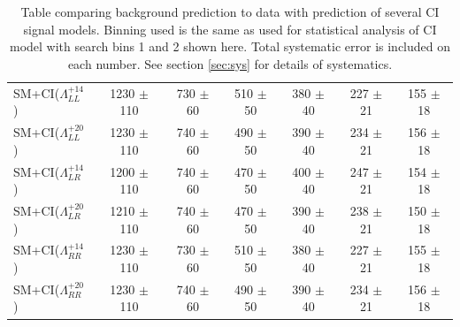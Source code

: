\begin {table}[h]
\begin{center}
\begin{tabular}{  l | c c c | c c c  }
			SM+CI($\Lambda^{+14}_{LL}$) & 1230 $\pm$ 110 & 730 $\pm$ 60 & 510 $\pm$ 50 & 380 $\pm$ 40 & 227 $\pm$ 21 & 155 $\pm$ 18 \\
			SM+CI($\Lambda^{+20}_{LL}$) & 1230 $\pm$ 110 & 740 $\pm$ 60 & 490 $\pm$ 50 & 390 $\pm$ 40 & 234 $\pm$ 21 & 156 $\pm$ 18 \\
			SM+CI($\Lambda^{+14}_{LR}$) & 1200 $\pm$ 110 & 740 $\pm$ 60 & 470 $\pm$ 50 & 400 $\pm$ 40 & 247 $\pm$ 21 & 154 $\pm$ 18 \\
			SM+CI($\Lambda^{+20}_{LR}$) & 1210 $\pm$ 110 & 740 $\pm$ 60 & 470 $\pm$ 50 & 390 $\pm$ 40 & 238 $\pm$ 21 & 150 $\pm$ 18 \\
			SM+CI($\Lambda^{+14}_{RR}$) & 1230 $\pm$ 110 & 730 $\pm$ 60 & 510 $\pm$ 50 & 380 $\pm$ 40 & 227 $\pm$ 21 & 155 $\pm$ 18 \\
			SM+CI($\Lambda^{+20}_{RR}$) & 1230 $\pm$ 110 & 740 $\pm$ 60 & 490 $\pm$ 50 & 390 $\pm$ 40 & 234 $\pm$ 21 & 156 $\pm$ 18 \\
			\hline
			\hline
		\end{tabular}
	  	\caption{Table comparing background prediction to data with prediction of several CI signal models. Binning used is the same as used for statistical analysis of CI model with search bins 1 and 2 shown here. Total systematic error is included on each number. See section \ref{sec:sys} for details of systematics.}
	  	\label{tab:CI_results1}
	  	\end{center}
	\end {table}

